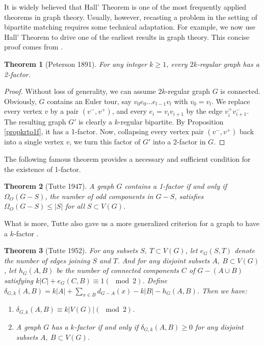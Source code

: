 \documentclass[12pt]{report}
\newtheorem{theorem}{Theorem}
\begin{document}
It is widely believed that Hall' Theorem is one of the most frequently applied theorems in graph theory. Usually, however, recasting a problem in the setting of bipartite matching requires some technical adaptation. For example, we now use Hall' Theorem to drive one of the earliest results in graph theory. This concise proof comes from \cite{diestel2000graph}.

\begin{theorem}[Peterson 1891]\label{petkre2fac}
For any integer $k\ge1$, every $2k$-regular graph has a 2-factor.
\end{theorem}

\begin{proof}
Without loss of generality, we can assume $2k$-regular graph $G$ is connected. Obviously, $G$ contains an Euler tour, say $v_0e_0\ldots e_{l-1}v_l$ with $v_0=v_l$. We replace every vertex $v$ by a pair $(v^-,v^+)$, and every $e_i=v_iv_{i+1}$ by the edge $v_i^+v^-_{i+1}$. The resulting graph $G'$ is clearly a $k$-regular bipartite. By Proposition \ref{propkrto1f}, it has a 1-factor. Now, collapsing every vertex pair $(v^-,v^+)$ back into a single vertex $v$, we turn this factor of $G'$ into a 2-factor in $G$.
\end{proof}

The following famous theorem provides a necessary and sufficient condition for the existence of 1-factor.
\begin{theorem}[Tutte 1947]\label{tutte otto1f}
A graph $G$ contains a 1-factor if and only if $\Omega_O(G-S)$, the number of odd components in $G-S$, satisfies $\Omega_O(G-S)\le|S|$ for all $S\subset V(G)$.
\end{theorem}


What is more, Tutte also gave us a more generalized criterion for a graph to have a $k$-factor \cite{tutte1952factors}.

\begin{theorem}[Tutte 1952]\label{tut1952cri1}
For any subsets $S,~T\subset V(G)$, let $e_G(S,T)$ denote the number of edges joining $S$ and $T$. And for any disjoint subsets $A,~B\subset V(G)$, let $h_G(A,B)$ be the number of connected components $C$ of $G-(A\cup B)$ satisfying $k|C|+e_G(C,B)\equiv1(\mod2)$. Define $\delta_{G,k}(A,B)=k|A|+\sum_{x\in B}d_{G-A}(x)-k|B|-h_G(A,B)$. Then we have:
\begin{enumerate}
\item $\delta_{G,k}(A,B)\equiv k|V(G)|(\mod2)$.
\item A graph $G$ has a $k$-factor if and only if $\delta_{G,k}(A,B)\ge0$ for any disjoint subsets $A,~B\subset V(G)$.
\end{enumerate}
\end{theorem}
\end{document}
